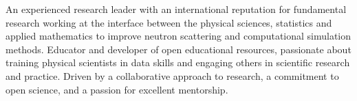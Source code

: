 \vspace{0.25cm}

\begin{cvparagraph}

An experienced research leader with an international reputation for fundamental research working at the interface between the physical sciences, statistics and applied mathematics to improve neutron scattering and computational simulation methods. 
Educator and developer of open educational resources, passionate about training physical scientists in data skills and engaging others in scientific research and practice. 
Driven by a collaborative approach to research, a commitment to open science, and a passion for excellent mentorship.
\end{cvparagraph}
